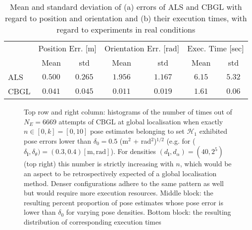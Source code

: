 \begin{table}[H]\footnotesize
\begin{tabular}{@{}lcccccc@{}}
     & \multicolumn{2}{l}{Position Err. {[}m{]}} & \multicolumn{2}{l}{Orientation Err. {[}rad{]}} & \multicolumn{2}{l}{Exec. Time {[}sec{]}} \\
     & Mean              & std              & Mean                & std                 & Mean                & std                \\ \midrule
ALS  & $0.500 $          & $0.265 $         & $1.956 $            & $1.167 $            & $6.15 $             & $5.32 $            \\
CBGL & $0.041 $          & $0.045 $         & $0.011 $            & $0.019 $            & $1.61 $             & $0.06 $            \\ \bottomrule
\end{tabular}
  \caption{\small Mean and standard deviation of (a) errors of ALS and CBGL with
                regard to position and orientation and (b) their execution times,
                with regard to experiments in real conditions}
\label{tbl:a}
\end{table}




\begin{figure}
  \vspace{-0.4cm}
  
  \vspace{-0.4cm}
  \caption{\small Top row and right column: histograms of the number of times
           out of $N_E = 6669$ attempts of CBGL at global localisation
           when exactly $n \in [0,k] = [0,10]$ pose estimates belonging to set
           $\mathcal{H}_1$ exhibited pose errors lower than
           $\delta_0 = 0.5$ (m$^2$ + rad$^2$)$^{1/2}$ (e.g. for
           ($\delta_{\bm{l}}, \delta_{\theta}) = (0.3,0.4) [\text{m},
           \text{rad}]$). For densities $(d_{\bm{l}},d_{\alpha}) = (40, 2^5)$
           (top right) this number is strictly increasing with $n$, which would
           be an aspect to be retrospectively expected of a global localisation
           method. Denser configurations adhere to the same pattern as well but
           would require more execution resources. Middle block: the resulting
           percent proportion of pose estimates whose pose error is lower than
           $\delta_0$ for varying pose densities. Bottom block: the resulting
           distribution of corresponding execution times
           }
  \label{fig:a:determine_40_32}
\end{figure}


